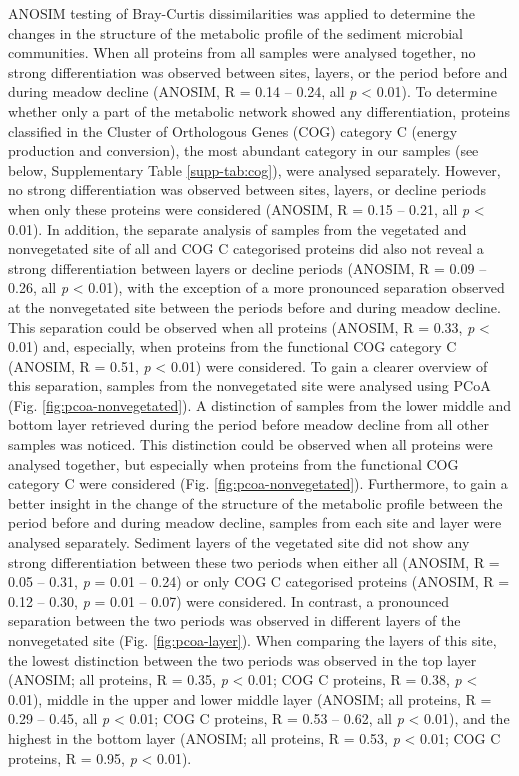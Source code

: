 \documentclass[
  12 pt,
]{article}
\begin{document}
ANOSIM testing of Bray-Curtis dissimilarities was applied to determine the changes in the structure of the metabolic profile of the sediment microbial communities. When all proteins from all samples were analysed together, no strong differentiation was observed between sites, layers, or the period before and during meadow decline (ANOSIM, R = 0.14 -- 0.24, all \emph{p} \textless{} 0.01). To determine whether only a part of the metabolic network showed any differentiation, proteins classified in the Cluster of Orthologous Genes (COG) category C (energy production and conversion), the most abundant category in our samples (see below, Supplementary Table \ref{supp-tab:cog}), were analysed separately. However, no strong differentiation was observed between sites, layers, or decline periods when only these proteins were considered (ANOSIM, R = 0.15 -- 0.21, all \emph{p} \textless{} 0.01). In addition, the separate analysis of samples from the vegetated and nonvegetated site of all and COG C categorised proteins did also not reveal a strong differentiation between layers or decline periods (ANOSIM, R = 0.09 -- 0.26, all \emph{p} \textless{} 0.01), with the exception of a more pronounced separation observed at the nonvegetated site between the periods before and during meadow decline. This separation could be observed when all proteins (ANOSIM, R = 0.33, \emph{p} \textless{} 0.01) and, especially, when proteins from the functional COG category C (ANOSIM, R = 0.51, \emph{p} \textless{} 0.01) were considered. To gain a clearer overview of this separation, samples from the nonvegetated site were analysed using PCoA (Fig. \ref{fig:pcoa-nonvegetated}). A distinction of samples from the lower middle and bottom layer retrieved during the period before meadow decline from all other samples was noticed. This distinction could be observed when all proteins were analysed together, but especially when proteins from the functional COG category C were considered (Fig. \ref{fig:pcoa-nonvegetated}). Furthermore, to gain a better insight in the change of the structure of the metabolic profile between the period before and during meadow decline, samples from each site and layer were analysed separately. Sediment layers of the vegetated site did not show any strong differentiation between these two periods when either all (ANOSIM, R = 0.05 -- 0.31, \emph{p} = 0.01 -- 0.24) or only COG C categorised proteins (ANOSIM, R = 0.12 -- 0.30, \emph{p} = 0.01 -- 0.07) were considered. In contrast, a pronounced separation between the two periods was observed in different layers of the nonvegetated site (Fig. \ref{fig:pcoa-layer}). When comparing the layers of this site, the lowest distinction between the two periods was observed in the top layer (ANOSIM; all proteins, R = 0.35, \emph{p} \textless{} 0.01; COG C proteins, R = 0.38, \emph{p} \textless{} 0.01), middle in the upper and lower middle layer (ANOSIM; all proteins, R = 0.29 -- 0.45, all \emph{p} \textless{} 0.01; COG C proteins, R = 0.53 -- 0.62, all \emph{p} \textless{} 0.01), and the highest in the bottom layer (ANOSIM; all proteins, R = 0.53, \emph{p} \textless{} 0.01; COG C proteins, R = 0.95, \emph{p} \textless{} 0.01).
\end{document}
